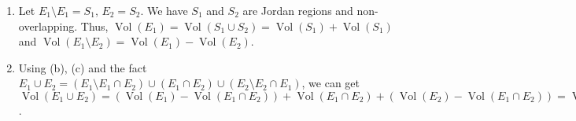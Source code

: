 \documentclass[12pt]{article}
\DeclareMathOperator{\volume}{Vol}
\DeclareMathOperator{\interior}{int}
\newcommand{\boundary}{\partial}
\begin{document}
\begin{enumerate}
\begin{enumerate}
        \begin{align*}
            \volume(\interior(E_1)) + \volume(\interior(E_1)) &= \volume(\interior(E_1) \cup \interior(E_2))\\
            &\leq \volume(\interior(E_1) \cup \interior(E_2)) + \volume(E_1 \cap E_2)\\
            &= \volume(E_1 \cup E_2)\\
            &\leq \volume(\interior(E_1)) + \volume(\interior(E_1)) + \volume(\boundary E_1) + \volume(\boundary E_2)\\
            &= \volume(\interior(E_1)) + \volume(\interior(E_2))\\
            &= \volume(E_1) + \volume(E_2)
        \end{align*}
        Thus, $\volume(E_1\cup E_2) = \volume(E_1) + \volume(E_2)$.

        \item Let $E_1\setminus E_1 = S_1$, $E_2 = S_2$.
        We have $S_1$ and $S_2$ are Jordan regions and non-overlapping.
        Thus, $\volume(E_1) = \volume(S_1 \cup S_2) = \volume(S_1) + \volume(S_1)$ and 
        $\volume(E_1\setminus E_2) = \volume(E_1) - \volume(E_2)$.

        \item Using (b), (c) and the fact $E_1 \cup E_2 = (E_1 \setminus E_1 \cap E_2) \cup (E_1 \cap E_2) \cup (E_2 \setminus E_2\cap E_1)$,
        we can get $\volume(E_1 \cup E_2) = (\volume(E_1) - \volume(E_1 \cap E_2)) + \volume(E_1 \cap E_2) + (\volume(E_2) - \volume(E_1 \cap E_2)) = \volume(E_1) + \volume(E_2) - \volume(E_1\cap E_2)$.
    \end{enumerate}
\end{enumerate}
\end{document}
